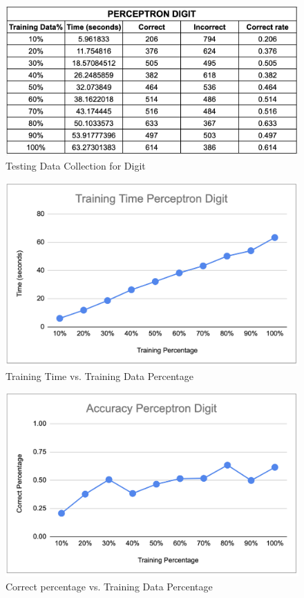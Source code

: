 \documentclass[11pt]{report}
\begin{document}
\begin{figure}[h]
\begin{center}
\includegraphics[scale=0.5]{Perceptron_digit_statistic.png} 
\end{center}
\caption{Testing Data Collection for Digit}
\end{figure}

\begin{figure}[h]
\begin{center}
\includegraphics[scale=0.5]{Perceptron_digit_traintime.png} 
\end{center}
\caption{Training Time vs. Training Data Percentage}
\end{figure}
\newpage
\begin{figure}[t]
\begin{center}
\includegraphics[scale=0.45]{Perceptron_digit_accuracy.png} 
\end{center}
\caption{Correct percentage vs. Training Data Percentage}
\end{figure}
\end{document}
